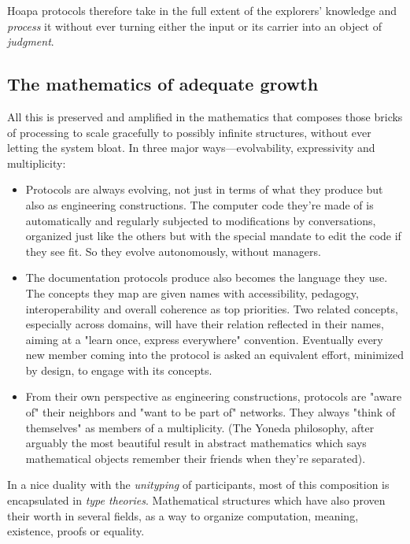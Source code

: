 \documentclass[11pt]{article}
\begin{document}
Hoapa protocols therefore take in the full extent of the explorers' knowledge and \emph{process} it without ever turning either the input or its carrier into an object of \emph{judgment}.

\subsection{The mathematics of adequate growth}

All this is preserved and amplified in the mathematics that composes those bricks of processing to scale gracefully to possibly infinite structures, without ever letting the system bloat. In three major ways---evolvability, expressivity and multiplicity:

\begin{itemize}

\item Protocols are always evolving, not just in terms of what they produce but also as engineering constructions. The computer code they're made of is automatically and regularly subjected to modifications by conversations, organized just like the others but with the special mandate to edit the code if they see fit. So they evolve autonomously, without managers.

\item The documentation protocols produce also becomes the language they use. The concepts they map are given names with accessibility, pedagogy, interoperability and overall coherence as top priorities. Two related concepts, especially across domains, will have their relation reflected in their names, aiming at a "learn once, express everywhere" convention. Eventually every new member coming into the protocol is asked an equivalent effort, minimized by design, to engage with its concepts.

\item From their own perspective as engineering constructions, protocols are "aware of" their neighbors and "want to be part of" networks. They always "think of themselves" as members of a multiplicity. (The Yoneda philosophy, after arguably the most beautiful result in abstract mathematics which says mathematical objects remember their friends when they're separated).

\end{itemize}

In a nice duality with the \emph{unityping} of participants, most of this composition is encapsulated in \emph{type theories}. Mathematical structures which have also proven their worth in several fields, as a way to organize computation, meaning, existence, proofs or equality.
\end{document}
